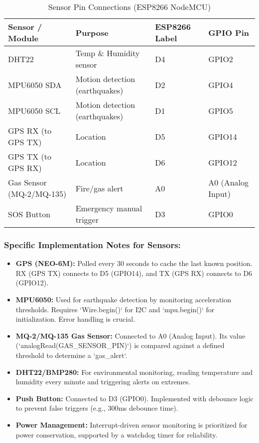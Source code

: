 \documentclass[12pt, a4paper]{article}
\begin{document}
\begin{table}[H]
    \centering
    \caption{Sensor Pin Connections (ESP8266 NodeMCU)}
    \label{tab:sensor_pins}
    \begin{tabular}{llll}
        \toprule
        \textbf{Sensor / Module} & \textbf{Purpose} & \textbf{ESP8266 Label} & \textbf{GPIO Pin} \\
        \midrule
        DHT22 & Temp \& Humidity sensor & D4 & GPIO2 \\
        MPU6050 SDA & Motion detection (earthquakes) & D2 & GPIO4 \\
        MPU6050 SCL & Motion detection (earthquakes) & D1 & GPIO5 \\
        GPS RX (to GPS TX) & Location & D5 & GPIO14 \\
        GPS TX (to GPS RX) & Location & D6 & GPIO12 \\
        Gas Sensor (MQ-2/MQ-135) & Fire/gas alert & A0 & A0 (Analog Input) \\
        SOS Button & Emergency manual trigger & D3 & GPIO0 \\
        \bottomrule
    \end{tabular}
\end{table}

\subsubsection{Specific Implementation Notes for Sensors:}
\begin{itemize}
    \item \textbf{GPS (NEO-6M):} Polled every 30 seconds to cache the last known position. RX (GPS TX) connects to D5 (GPIO14), and TX (GPS RX) connects to D6 (GPIO12).
    \item \textbf{MPU6050:} Used for earthquake detection by monitoring acceleration thresholds. Requires `Wire.begin()` for I2C and `mpu.begin()` for initialization. Error handling is crucial.
    \item \textbf{MQ-2/MQ-135 Gas Sensor:} Connected to A0 (Analog Input). Its value (`analogRead(GAS_SENSOR_PIN)`) is compared against a defined threshold to determine a `gas_alert`.
    \item \textbf{DHT22/BMP280:} For environmental monitoring, reading temperature and humidity every minute and triggering alerts on extremes.
    \item \textbf{Push Button:} Connected to D3 (GPIO0). Implemented with debounce logic to prevent false triggers (e.g., 300ms debounce time).
    \item \textbf{Power Management:} Interrupt-driven sensor monitoring is prioritized for power conservation, supported by a watchdog timer for reliability.
\end{itemize}
\end{document}
